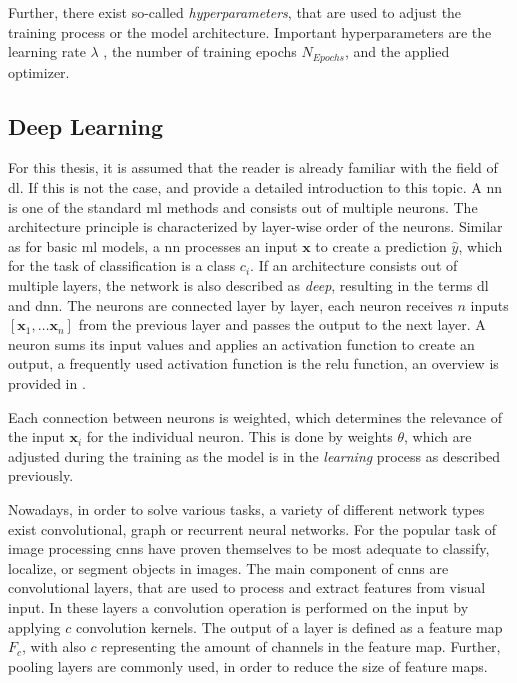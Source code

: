 Further, there exist so-called \textit{hyperparameters}, that are used to adjust the training process or the model architecture.
Important hyperparameters are the learning rate $\lambda$ , the number of training epochs $N_{Epochs}$, and the applied optimizer.


\subsection{Deep Learning}\label{ord:ch2:sec1:subsec2}

For this thesis, it is assumed that the reader is already familiar with the field of \gls{dl}. 
If this is not the case, \cite{Goodfellow-et-al-2016} and \cite{Ger17-HandsOn} provide a detailed introduction to this topic.
A \gls{nn} is one of the standard \gls{ml} methods and consists out of multiple neurons.
The architecture principle is characterized by layer-wise order of the neurons.
Similar as for basic \gls{ml} models, a \gls{nn} processes an input $ \textbf{x} $ to create a prediction $ \hat{y} $, which for the task of classification is a class $ c_i $.
If an architecture consists out of multiple layers, the network is also described as \textit{deep}, resulting in the terms \gls{dl} and \gls{dnn}.
The neurons are connected layer by layer, each neuron receives $ n $ inputs $ \left[\textbf{x}_1, \dots \textbf{x}_n \right] $ from the previous layer and passes the output to the next layer.
A neuron sums its input values and applies an activation function to create an output, a frequently used activation function is the \gls{relu} function, an overview is provided in \Cite{SSA20-Activationfunctions}. 

Each connection between neurons is weighted, which determines the relevance of the input $ \textbf{x}_i $ for the individual neuron.
This is done by weights $ \theta $, which are adjusted during the training as the model is in the \textit{learning} process as described previously.

Nowadays, in order to solve various tasks, a variety of different network types exist \eg convolutional, graph or recurrent neural networks.
For the popular task of image processing \glspl{cnn} have proven themselves to be most adequate to classify, localize, or segment objects in images.
The main component of \glspl{cnn} are convolutional layers, that are used to process and extract features from visual input.
In these layers a convolution operation is performed on the input by applying $c$ convolution kernels.
The output of a layer is defined as a feature map $F_c$, with also $c$ representing the amount of channels in the feature map.
Further, pooling layers are commonly used, in order to reduce the size of feature maps.

